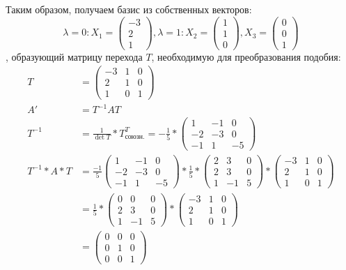 \documentclass[12pt, a4paper]{article}
\begin{document}
Таким образом, получаем базис из собственных векторов:
\begin{equation} \label{basis}
\lambda = 0: X_1 =\begin{pmatrix}
-3\\
2\\
1
\end{pmatrix}, \lambda = 1: X_2 = \begin{pmatrix}
1\\
1\\
0
\end{pmatrix}, X_3 = \begin{pmatrix}
0\\
0\\
1
\end{pmatrix}
\end{equation},
образующий матрицу перехода $T$, необходимую для преобразования подобия:
\begin{equation*}
\begin{aligned}
T &=\begin{pmatrix}
-3 & 1 & 0\\
2 & 1  & 0\\
1 & 0 & 1
\end{pmatrix}\\
A' &= T^{-1}AT\\
T^{-1} &= \frac{1}{\det T} * T_{\text{союзн.}}^T = -\frac{1}{5} * \begin{pmatrix}
1 & -1 & 0\\
-2 & -3  & 0\\
-1 & 1 & -5
\end{pmatrix}\\
T^{-1}*A*T &= \frac{-1}{5}\begin{pmatrix}
1 & -1 & 0\\
-2 & -3  & 0\\
-1 & 1 & -5
\end{pmatrix} * \frac{1}{5}*\begin{pmatrix}
2 & 3 & 0\\
2 & 3 & 0\\
1 & -1 & 5
\end{pmatrix} * \begin{pmatrix}
-3 & 1 & 0\\
2 & 1  & 0\\
1 & 0 & 1
\end{pmatrix}\\
&= \frac{1}{5}*\begin{pmatrix}
0 & 0 & 0\\
2 & 3 & 0\\
1 & -1 & 5
\end{pmatrix} * \begin{pmatrix}
-3 & 1 & 0\\
2 & 1  & 0\\
1 & 0 & 1
\end{pmatrix}\\ 
&= \begin{pmatrix}
0 & 0 & 0\\
0 & 1  & 0\\
0 & 0 & 1
\end{pmatrix}\\
\end{aligned}
\end{equation*}
\end{document}
